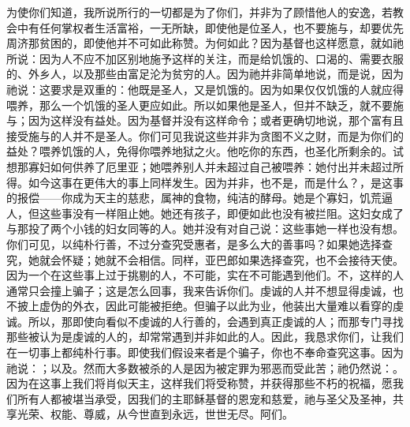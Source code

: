 为使你们知道，我所说所行的一切都是为了你们，并非为了顾惜他人的安逸，若教会中有任何掌权者生活富裕，一无所缺，即使他是位圣人，也不要施与，却要优先周济那贫困的，即使他并不可如此称赞。为何如此？因为基督也这样愿意，就如祂所说：因为人不应不加区别地施予这样的关注，而是给饥饿的、口渴的、需要衣服的、外乡人，以及那些由富足沦为贫穷的人。因为祂并非简单地说，而是说，因为祂说：这要求是双重的：他既是圣人，又是饥饿的。因为如果仅仅饥饿的人就应得喂养，那么一个饥饿的圣人更应如此。所以如果他是圣人，但并不缺乏，就不要施与；因为这样没有益处。因为基督并没有这样命令；或者更确切地说，那个富有且接受施与的人并不是圣人。你们可见我说这些并非为贪图不义之财，而是为你们的益处？喂养饥饿的人，免得你喂养地狱之火。他吃你的东西，也圣化所剩余的。试想那寡妇如何供养了厄里亚；她喂养别人并未超过自己被喂养：她付出并未超过所得。如今这事在更伟大的事上同样发生。因为并非，也不是，而是什么？，是这事的报偿——你成为天主的慈悲，属神的食物，纯洁的酵母。她是个寡妇，饥荒逼人，但这些事没有一样阻止她。她还有孩子，即便如此也没有被拦阻。这妇女成了与那投了两个小钱的妇女同等的人。她并没有对自己说：这些事她一样也没有想。你们可见，以纯朴行善，不过分查究受惠者，是多么大的善事吗？如果她选择查究，她就会怀疑；她就不会相信。同样，亚巴郎如果选择查究，也不会接待天使。因为一个在这些事上过于挑剔的人，不可能，实在不可能遇到他们。不，这样的人通常只会撞上骗子；这是怎么回事，我来告诉你们。虔诚的人并不想显得虔诚，也不披上虚伪的外衣，因此可能被拒绝。但骗子以此为业，他装出大量难以看穿的虔诚。所以，那即使向看似不虔诚的人行善的，会遇到真正虔诚的人；而那专门寻找那些被认为是虔诚的人的，却常常遇到并非如此的人。因此，我恳求你们，让我们在一切事上都纯朴行事。即使我们假设来者是个骗子，你也不奉命查究这事。因为祂说：；以及。然而大多数被杀的人是因为被定罪为邪恶而受此苦；祂仍然说：。因为在这事上我们将肖似天主，这样我们将受称赞，并获得那些不朽的祝福，愿我们所有人都被堪当承受，因我们的主耶稣基督的恩宠和慈爱，祂与圣父及圣神，共享光荣、权能、尊威，从今世直到永远，世世无尽。阿们。\par

